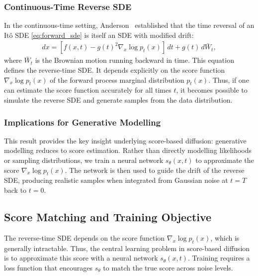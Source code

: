 \documentclass[a4paper,12pt]{article}
\begin{document}
\subsubsection{Continuous-Time Reverse SDE}
In the continuous-time setting, Anderson~\cite{andersonReversetimeDiffusionEquation1982} established that the time reversal of an It\^{o} SDE \eqref{eq:forward_sde}
is itself an SDE with modified drift:
\begin{align}\label{eq:reverse_sde}
    dx = \left[f(x,t) - g(t)^2 \nabla_x \log p_t(x)\right]\,dt + g(t)\,d\bar W_t,
\end{align}
where \(\bar W_t\) is the Brownian motion running backward in time. This equation defines the reverse-time SDE. It depends explicitly on the score function \(\nabla_x \log p_t(x)\) of the forward process marginal distribution \(p_t(x)\). Thus, if one can estimate the score function accurately for all times \(t\), it becomes possible to simulate the reverse SDE and generate samples from the data distribution.

\subsubsection{Implications for Generative Modelling}
This result provides the key insight underlying score-based diffusion: generative modelling reduces to score estimation. 
Rather than directly modelling likelihoods or sampling distributions, we train a neural network \(s_\theta(x,t)\) to approximate the score \(\nabla_x \log p_t(x)\). The network is then used to guide the drift of the reverse SDE, producing realistic samples when integrated from Gaussian noise at \(t = T\) back to \(t = 0\).

\subsection{Score Matching and Training Objective}
The reverse-time SDE depends on the score function \(\nabla_x \log p_t(x)\), which is generally intractable. Thus, the central learning problem in score-based diffusion is to approximate this score with a neural network \(s_\theta(x,t)\). Training requires a loss function that encourages \(s_\theta\) to match the true score across noise levels.
\end{document}
